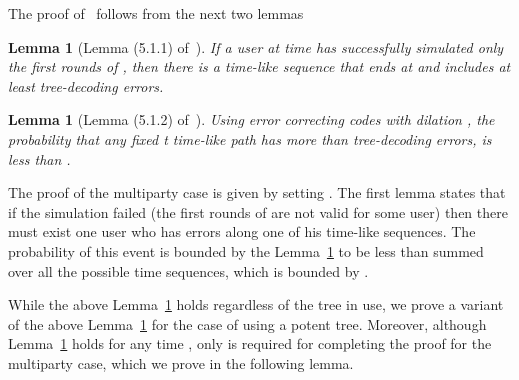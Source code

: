 \documentclass[ letterpaper, 11pt]{article}
\newtheorem{lemma}[theorem]{Lemma}
\newcommand{\potent}{potent\xspace}
\begin{document}
The proof of~\cite{RS94} follows from the next two lemmas
\begin{lemma}[Lemma (5.1.1) of~\cite{RS94}]\label{lem:rsOne}
If a user  at time  has successfully simulated only the first  rounds of ,
then there is a  time-like sequence that ends at  and
includes at least  tree-decoding errors.
\end{lemma}
\begin{lemma}[Lemma (5.1.2) of~\cite{RS94}]\label{lem:rsTwo}
Using error correcting codes with dilation ,
the probability that any fixed t time-like path has more than
 tree-decoding errors, is less than
.
\end{lemma}
The proof of the multiparty case is given by setting .
The first lemma states that if the simulation failed
(the first  rounds of  are not valid for some user)
then there must exist one user who has  errors along one of his  time-like sequences.
The probability of this event is bounded by the Lemma~\ref{lem:rsTwo} to be
less than  summed over
all the  possible time sequences, which is bounded by .


While the above Lemma~\ref{lem:rsOne} holds regardless of the tree in use,
we prove a variant of the above Lemma~\ref{lem:rsTwo}
for the case of using a \potent tree.
Moreover, although Lemma~\ref{lem:rsTwo} holds for any time , only  is required
for completing the proof for the multiparty case, which we prove in the following lemma.
\end{document}
